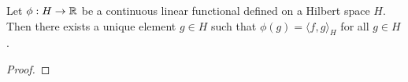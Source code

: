 \begin{theorem}
    \cite[p. 22]{small1994hilbert}
    Let \(\phi : H \to \mathbb{R}\) be a continuous linear functional defined on a Hilbert space \(H\).
    Then there exists a unique element \(g \in H\) such that \(\phi(g) = \langle f, g \rangle_H\) for all \(g \in H\).
\end{theorem}

\begin{proof}
    
\end{proof}